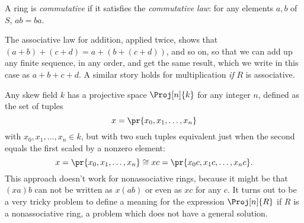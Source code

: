 A ring is \emph{commutative} if it satisfies the \emph{commutative law}: for any elements \(a, b\) of \(S\), \(ab=ba\).

The associative law for addition, applied twice, shows that \((a+b)+(c+d)=a+(b+(c+d))\), and so on, so that we can add up any finite sequence, in any order, and get the same result, which we write in this case as \(a+b+c+d\).
A similar story holds for multiplication \emph{if} \(R\) is associative.

Any skew field \(k\) has a projective space \(\Proj[n]{k}\) for any integer \(n\), defined as the set of tuples 
\[
x=\pr{x_0,x_1,\dots,x_n}
\]
with \(x_0, x_1, \dots, x_n \in k\), but with two such tuples equivalent just when the second equals the first scaled by a nonzero element:
\[
x=\pr{x_0,x_1,\dots,x_n}
\cong
xc=\pr{x_0c,x_1c,\dots,x_nc}.
\]
This approach doesn't work for nonassociative rings, because it might be that \((xa)b\) can not be written as \(x(ab)\) or even as \(xc\) for any \(c\).
It turns out to be a very tricky problem to define a meaning for the expression \(\Proj[n]{R}\) if \(R\) is a nonassociative ring, a problem which does not have a general solution.

